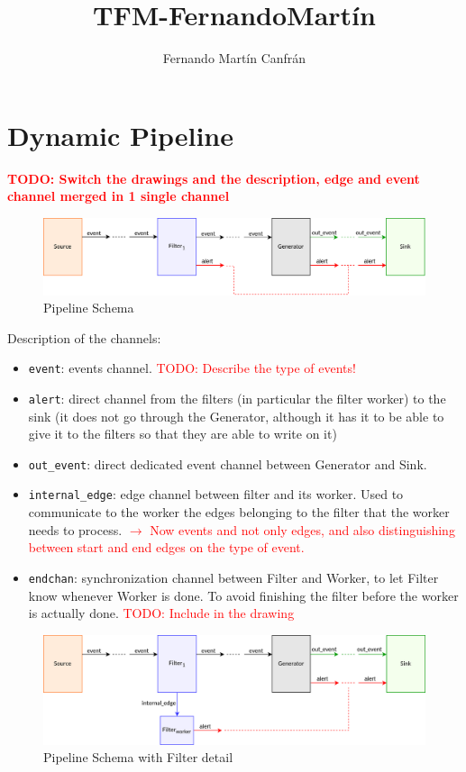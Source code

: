 \documentclass{article}
\title{TFM-FernandoMartín}
\author{Fernando Martín Canfrán}
\begin{document}
\section{Dynamic Pipeline}

\textcolor{red}{\textbf{TODO: Switch the drawings and the description, edge and event channel merged in 1 single channel}}\\

\begin{figure}[H]
    \centering
    \includegraphics[scale = 0.7]{images/pipeline-schema.png}
    \caption{Pipeline Schema}
    \label{img:pipeline-schema}
\end{figure}

Description of the channels:
\begin{itemize}
    \item \texttt{event}: events channel. \textcolor{red}{TODO: Describe the type of events!}
    \item \texttt{alert}: direct channel from the filters (in particular the filter worker) to the sink (it does not go through the Generator, although it has it to be able to give it to the filters so that they are able to write on it)
    \item \texttt{out\_event}: direct dedicated event channel between Generator and Sink.
    \item \texttt{internal\_edge}: edge channel between filter and its worker. Used to communicate to the worker the edges belonging to the filter that the worker needs to process. \textcolor{red}{$\rightarrow$ Now events and not only edges, and also distinguishing between start and end edges on the type of event.}
    \item \texttt{endchan}: synchronization channel between Filter and Worker, to let Filter know whenever Worker is done. To avoid finishing the filter before the worker is actually done. \textcolor{red}{TODO: Include in the drawing}
  \end{itemize}


\begin{figure}[H]
  \centering
  \includegraphics[scale = 0.7]{images/pipeline-schema-filter-detail.png}
  \caption{Pipeline Schema with Filter detail}
  \label{img:pipeline-schema-0}
\end{figure}
\end{document}
